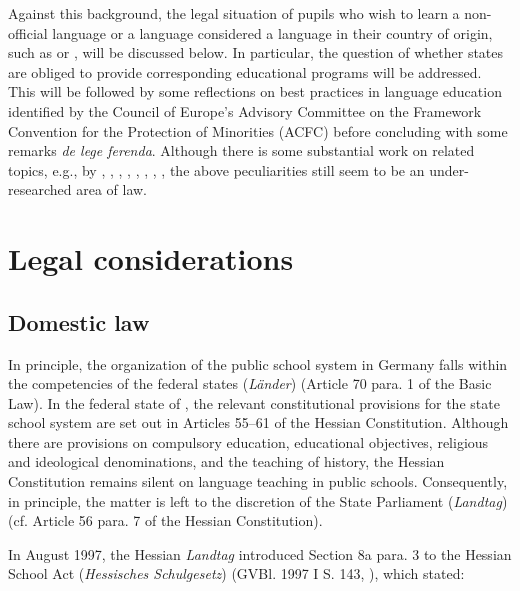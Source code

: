 \documentclass[output=paper,colorlinks,citecolor=brown]{langscibook}
\begin{document}
Against this background, the legal situation of pupils who wish to learn a non-official language or a language considered a  language in their country of origin, such as  or , will be discussed below. In particular, the question of whether states are obliged to provide corresponding educational programs will be addressed. This will be followed by some reflections on best practices in  language education identified by the Council of Europe's Advisory Committee on the Framework Convention for the Protection of  Minorities (ACFC) before concluding with some remarks \textit{de lege ferenda}. Although there is some substantial work on related topics, e.g., by \citet{langenfeld1998}, \citet{schmahl2004}, \citet{medda-windischer2008}, \citet{gogolin_oeter2011}, \citet{guliyeva2013}, \citet{palermo2019}, \citet{jacob-owens2022}, \citet{bayat2023}, the above peculiarities still seem to be an under-researched area of law.

\section{Legal considerations}\label{CH3.ss.2}

\subsection{Domestic law}\label{CH3.ss.2.1}

In principle, the organization of the public school system in Germany falls within the competencies of the federal states (\textit{Länder}) (Article 70 para. 1 of the Basic Law). In the federal state of , the relevant constitutional provisions for the state school system are set out in Articles 55--61 of the Hessian Constitution. Although there are provisions on compulsory education, educational objectives, religious and ideological denominations, and the teaching of history, the Hessian Constitution remains silent on language teaching in public schools. Consequently, in principle, the matter is left to the discretion of the State Parliament (\textit{Landtag}) (cf. Article 56 para. 7 of the Hessian Constitution).

In August 1997, the Hessian \textit{Landtag} introduced Section 8a para. 3 to the Hessian School Act (\textit{Hessisches Schulgesetz}) (GVBl. 1997 I S. 143, \citealt{gvbl1997}), which stated: 
\end{document}
